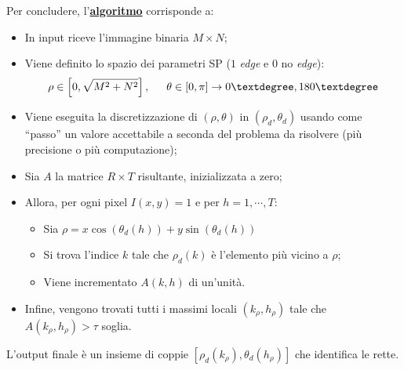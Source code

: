 \documentclass[a4paper]{article}
\newcommand{\dquotes}[1]{``#1''}
\begin{document}
	\noindent
	Per concludere, l'\textbf{\underline{algoritmo}} corrisponde a:
	\begin{itemize}
		\item In input riceve l'immagine binaria $M \times N$;

		\item Viene definito lo spazio dei parametri SP ($1$ \emph{edge} e $0$ no \emph{edge}):
		\begin{equation*}
			\rho \in \left[0, \sqrt{M^{2} + N^{2}}\right], \hspace{1.5em} \theta \in \left[0, \pi\right] \rightarrow 0°, 180°
		\end{equation*}
	
		\item Viene eseguita la discretizzazione di $\left(\rho, \theta\right)$ in $\left(\rho_{d}, \theta_{d}\right)$ usando come \dquotes{passo} un valore accettabile a seconda del problema da risolvere (più precisione o più computazione);
		
		\item Sia $A$ la matrice $R \times T$ risultante, inizializzata a zero;
		
		\item Allora, per ogni pixel $I\left(x,y\right) = 1$ e per $h = 1, \cdots, T$:
		\begin{itemize}
			\item Sia $\rho = x \cos\left(\theta_{d}\left(h\right)\right) + y \sin\left(\theta_{d}\left(h\right)\right)$
			\item Si trova l'indice $k$ tale che $\rho_{d}\left(k\right)$ è l'elemento più vicino a $\rho$;
			\item Viene incrementato $A\left(k,h\right)$ di un'unità.
		\end{itemize}
	
		\item Infine, vengono trovati tutti i massimi locali $\left(k_{\rho}, h_{\rho}\right)$ tale che $A\left(k_{\rho}, h_{\rho}\right) > \tau$ soglia.
	\end{itemize}
	L'output finale è un insieme di coppie $\left[\rho_{d}\left(k_{\rho}\right), \theta_{d}\left(h_{\rho}\right)\right]$ che identifica le rette.\newline
	
\end{document}
